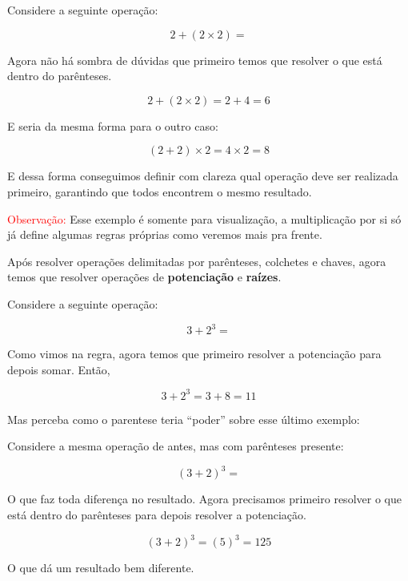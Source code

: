 \begin{exemplo}
    Considere a seguinte operação:

    \begin{equation}
        2+(2\times2) = 
    \end{equation}

    Agora não há sombra de dúvidas que primeiro temos que resolver o que está dentro do parênteses. 
    
    \begin{equation}
        2+(2\times2) = 2+4=6
    \end{equation}

    E seria da mesma forma para o outro caso:
    
    \begin{equation}
        (2+2)\times2 = 4\times2 = 8
    \end{equation}

    E dessa forma conseguimos definir com clareza qual operação deve ser realizada primeiro, garantindo que todos encontrem o mesmo resultado.

    \textcolor{red}{Observação:} Esse exemplo é somente para visualização, a multiplicação por si só já define algumas regras próprias como veremos mais pra frente.
\end{exemplo}

\begin{tcolorbox}[title = Potenciações e Raízes]
    Após resolver operações delimitadas por parênteses, colchetes e chaves, agora temos que resolver operações de \textbf{potenciação} e \textbf{raízes}.
\end{tcolorbox}

\begin{exemplo}
    Considere a seguinte operação:

    \begin{equation}
        3+2^3=
    \end{equation}

    Como vimos na regra, agora temos que primeiro resolver a potenciação para depois somar. Então,

    \begin{equation}
        3+2^3=3+8=11
    \end{equation}
\end{exemplo}

Mas perceba como o parentese teria ``poder'' sobre esse último exemplo:

\begin{exemplo}
    Considere a mesma operação de antes, mas com parênteses presente:

    \begin{equation}
        (3+2)^3=
    \end{equation}

    O que faz toda diferença no resultado. Agora precisamos primeiro resolver o que está dentro do parênteses para depois resolver a potenciação.

    \begin{equation}
        (3+2)^3 = (5)^3 = 125
    \end{equation}

    O que dá um resultado bem diferente.
\end{exemplo}


